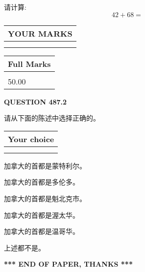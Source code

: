 \documentclass{ctexart}
\begin{document}
  
 
请计算:
\begin{equation}
42 +  %
68 = \nonumber
\end{equation}
 

 

 
  
\vspace{0.2in}
  
\noindent\begin{tabular}{|l|}
\hline
 YOUR MARKS  \\
\hline
 \\ 
 \\ 
\hline
\end{tabular}
\hspace{0.05in} \begin{tabular}{|l|}
\hline
 Full Marks  \\
\hline
 \\ 
50.00 \\
\hline
\end{tabular}
{\textbf{\Large{QUESTION
487.2 
}}}
  
  
请从下面的陈述中选择正确的。
  
  
\noindent\hspace{3.0in} \begin{tabular}{|l|}
\hline
Your choice \\
\hline
 \\ 
 \\ 
\hline
\end{tabular}
  
  
 
 
加拿大的首都是蒙特利尔。
 
 
加拿大的首都是多伦多。
 
 
加拿大的首都是魁北克市。
 
 
加拿大的首都是渥太华。
 
 
加拿大的首都是温哥华。
 
 
 上述都不是。
 
 
   
   
 \vspace{0.2in}
 
   
   
   
   
\vspace{1.0in} 
{\textbf{\large{ *** END OF PAPER, THANKS *** }}} 
   
\end{document}
